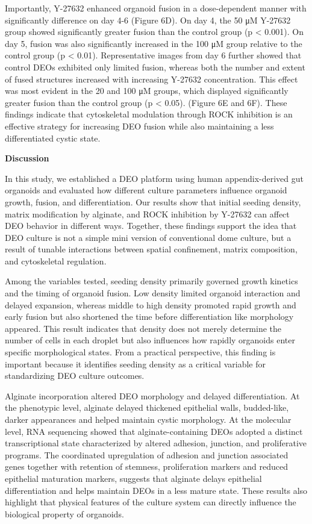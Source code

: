\documentclass[
]{article}
\begin{document}
Importantly, Y-27632 enhanced organoid fusion in a dose-dependent manner with significantly difference on day 4-6 (Figure 6D). On day 4, the 50 μM Y-27632 group showed significantly greater fusion than the control group (p \textless{} 0.001). On day 5, fusion was also significantly increased in the 100 μM group relative to the control group (p \textless{} 0.01). Representative images from day 6 further showed that control DEOs exhibited only limited fusion, whereas both the number and extent of fused structures increased with increasing Y-27632 concentration. This effect was most evident in the 20 and 100 μM groups, which displayed significantly greater fusion than the control group (p \textless{} 0.05). (Figure 6E and 6F). These findings indicate that cytoskeletal modulation through ROCK inhibition is an effective strategy for increasing DEO fusion while also maintaining a less differentiated cystic state.

\textbf{Discussion}

In this study, we established a DEO platform using human appendix-derived gut organoids and evaluated how different culture parameters influence organoid growth, fusion, and differentiation. Our results show that initial seeding density, matrix modification by alginate, and ROCK inhibition by Y-27632 can affect DEO behavior in different ways. Together, these findings support the idea that DEO culture is not a simple mini version of conventional dome culture, but a result of tunable interactions between spatial confinement, matrix composition, and cytoskeletal regulation.

Among the variables tested, seeding density primarily governed growth kinetics and the timing of organoid fusion. Low density limited organoid interaction and delayed expansion, whereas middle to high density promoted rapid growth and early fusion but also shortened the time before differentiation like morphology appeared. This result indicates that density does not merely determine the number of cells in each droplet but also influences how rapidly organoids enter specific morphological states. From a practical perspective, this finding is important because it identifies seeding density as a critical variable for standardizing DEO culture outcomes.

Alginate incorporation altered DEO morphology and delayed differentiation. At the phenotypic level, alginate delayed thickened epithelial walls, budded-like, darker appearances and helped maintain cystic morphology. At the molecular level, RNA sequencing showed that alginate-containing DEOs adopted a distinct transcriptional state characterized by altered adhesion, junction, and proliferative programs. The coordinated upregulation of adhesion and junction associated genes together with retention of stemness, proliferation markers and reduced epithelial maturation markers, suggests that alginate delays epithelial differentiation and helps maintain DEOs in a less mature state. These results also highlight that physical features of the culture system can directly influence the biological property of organoids.
\end{document}
